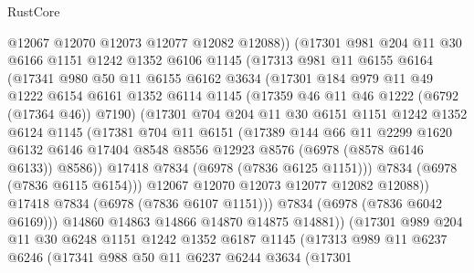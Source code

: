 \begin{lexlean}{RustCore}
\begin{coremodule}
              @12067
              @12070
              @12073
              @12077
              @12082
              @12088))
          (@17301
            @981
            @204
            @11
            @30
            @6166
            @1151
            @1242
            @1352
            @6106
            @1145
            (@17313
              @981
              @11
              @6155
              @6164
              (@17341
                @980
                @50
                @11
                @6155
                @6162
                @3634
                (@17301
                  @184
                  @979
                  @11
                  @49
                  @1222
                  @6154
                  @6161
                  @1352
                  @6114
                  @1145
                  (@17359 @46 @11 @46 @1222 (@6792 (@17364 @46)) @7190)
                  (@17301
                    @704
                    @204
                    @11
                    @30
                    @6151
                    @1151
                    @1242
                    @1352
                    @6124
                    @1145
                    (@17381
                      @704
                      @11
                      @6151
                      (@17389
                        @144
                        @66
                        @11
                        @2299
                        @1620
                        @6132
                        @6146
                        @17404
                        @8548
                        @8556
                        @12923
                        @8576
                        (@6978 (@8578 @6146 @6133))
                        @8586))
                    @17418
                    @7834
                    (@6978 (@7836 @6125 @1151)))
                  @7834
                  (@6978 (@7836 @6115 @6154)))
                @12067
                @12070
                @12073
                @12077
                @12082
                @12088))
            @17418
            @7834
            (@6978 (@7836 @6107 @1151)))
          @7834
          (@6978 (@7836 @6042 @6169)))
        @14860
        @14863
        @14866
        @14870
        @14875
        @14881))
    (@17301
      @989
      @204
      @11
      @30
      @6248
      @1151
      @1242
      @1352
      @6187
      @1145
      (@17313
        @989
        @11
        @6237
        @6246
        (@17341
          @988
          @50
          @11
          @6237
          @6244
          @3634
          (@17301

\end{coremodule}
\end{lexlean}
